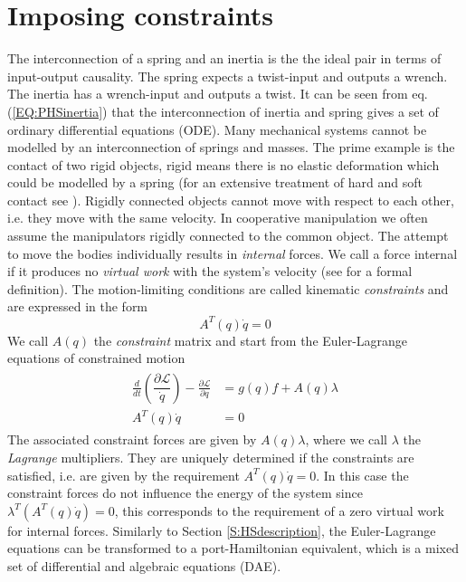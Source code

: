 \documentclass[a4paper,twoside, openright,12pt]{report}
\begin{document}
\section{Imposing constraints}\label{S:ImposingConstraints}
The interconnection of a spring and an inertia is the the ideal pair in terms of input-output causality. The spring expects a twist-input and outputs a wrench. The inertia has a wrench-input and outputs a twist. It can be seen from eq. (\ref{EQ:PHSinertia}) that the interconnection of inertia and spring gives a set of ordinary differential equations (ODE). Many mechanical systems cannot be modelled by an interconnection of springs and masses. The prime example is the contact of two rigid objects, rigid means there is no elastic deformation which could be modelled by a spring (for an extensive treatment of hard and soft contact see \cite{Duindam_09}). Rigidly connected objects cannot move with respect to each other, i.e. they move with the same velocity. In cooperative manipulation we often assume the manipulators rigidly connected to the common object. The attempt to  move the bodies individually results in \emph{internal} forces. We call a force internal if it produces no \emph{virtual work} with the system's velocity (see \cite{Erhart_16} for a formal definition). The motion-limiting conditions are called kinematic \emph{constraints} and are expressed in the form
\begin{equation}
A^T(q)\dot{q}=0
\end{equation}
We call $A(q)$ the \emph{constraint} matrix and start from the Euler-Lagrange equations of constrained motion \cite{duindam2009geoplexbook}
\begin{eqnarray}
\begin{aligned}
\frac{d}{dt}\left(\dfrac{\partial \mathcal{L}}{\dot{q}}\right) - \frac{\partial \mathcal{L}}{\partial q} &= g(q)f + A(q)\lambda
\\
A^T(q)\dot{q} &= 0
\end{aligned}
\end{eqnarray}
The associated constraint forces are given by $A(q)\lambda$, where we call $\lambda$ the \emph{Lagrange} multipliers. They are uniquely determined if the constraints are satisfied, i.e. are given by the requirement $A^T(q)\dot{q}=0$. In this case the constraint forces do not influence the energy of the system since $\lambda^T (A^T(q)\dot{q}) = 0$, this corresponds to the requirement of a zero virtual work for internal forces. Similarly to Section \ref{S:HSdescription}, the Euler-Lagrange equations can be transformed to a port-Hamiltonian equivalent, which is a mixed set of differential and algebraic equations (DAE).
\end{document}
